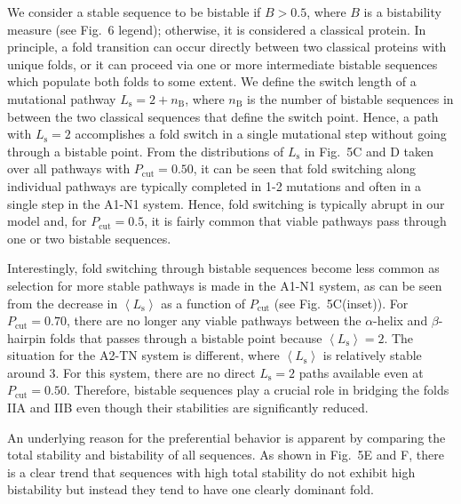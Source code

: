 \documentclass[
aip,
rsi,%
amsmath,amssymb,
reprint,%
]{revtex4-1}
\newcommand {\Pcut}     	{{P_\mathrm{cut}}}
\begin{document}
We consider a stable sequence to be bistable if $B>0.5$, where $B$ is a bistability measure (see Fig.~6 legend); otherwise, it is considered a classical protein. In principle, a fold transition can occur directly between two classical proteins with unique folds, or it can proceed via one or more intermediate bistable sequences which populate both folds to some extent. We  define the switch length of a mutational pathway $L_\mathrm{s}=2+n_\mathrm{B}$, where $n_\mathrm{B}$ is the number of bistable sequences in between the two classical sequences that define the switch point. Hence, a path with $L_\mathrm{s}=2$ accomplishes a fold switch in a single mutational step without going through a bistable point. From the distributions of  $L_\mathrm{s}$ in Fig.~5C and D taken over all pathways with $\Pcut=0.50$, it can be seen that fold switching along individual pathways are typically completed in 1-2 mutations and often in a single step in the A1-N1 system. Hence, fold switching is typically abrupt in our model and, for $\Pcut = 0.5$, it is fairly common that viable pathways pass through one or two bistable sequences. 

Interestingly, fold switching through bistable sequences become less common as selection for more stable pathways is made in the A1-N1 system, as can be seen from the decrease in $\left <L_\mathrm{s}\right >$ as a function of $\Pcut$ (see Fig.~5C(inset)). For $\Pcut=0.70$, there are no longer any viable pathways between the $\alpha$-helix and $\beta$-hairpin folds that passes through a bistable point because $\left <L_\mathrm{s}\right > =  2$. The situation for the A2-TN system is different, where $\left <L_\mathrm{s}\right >$ is relatively stable around 3. For this system, there are no direct $L_\mathrm{s}=2$ paths available even at $\Pcut=0.50$. Therefore, bistable sequences play a crucial role in bridging the folds IIA and IIB even though their stabilities are significantly reduced. 

An underlying reason for the preferential behavior is apparent by comparing the total stability and bistability of all sequences. As shown in Fig.~5E and F, there is a clear trend that sequences with high total stability do not exhibit high bistability but instead they tend to have one clearly dominant fold.\\

%
%
 
\end{document}
